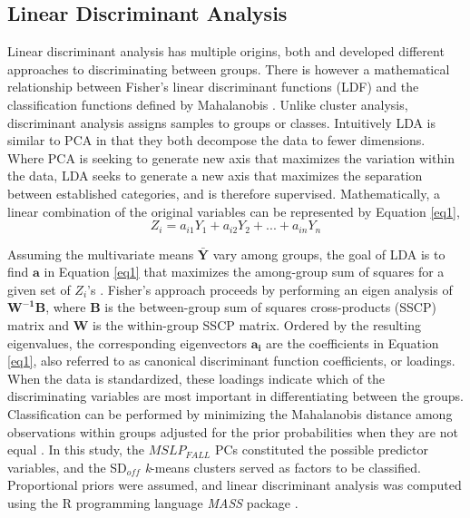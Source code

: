 \documentclass{tATO2e}
\newcommand{\sdoff}{SD$_{off}$}
\begin{document}
\subsection{Linear Discriminant Analysis}
Linear discriminant analysis has multiple origins, both \cite{Fisher1936} and \cite{Mahalanobis1936} developed different approaches to discriminating between groups. There is however a mathematical relationship between Fisher’s linear discriminant functions (LDF) and the classification functions defined by Mahalanobis \citep[e.g.,][]{Kshirsagar1975}. Unlike cluster analysis, discriminant analysis assigns samples to groups or classes. Intuitively LDA is similar to PCA in that they both decompose the data to fewer dimensions. Where PCA is seeking to generate new axis that maximizes the variation within the data, LDA seeks to generate a new axis that maximizes the separation between established categories, and is therefore supervised. Mathematically, a linear combination of the original variables can be represented by Equation \ref{eq1},
\begin{equation}
	Z_{i} = a_{i1}Y_{1} + a_{i2}Y_{2} + ... + a_{in}Y_{n}
	\label{eq1}
\end{equation}

Assuming the multivariate means $\mathbf{\bar{Y}}$ vary among groups, the goal of LDA is to find $\mathbf{a}$ in Equation \ref{eq1} that maximizes the among-group sum of squares for a given set of $Z_{i}$'s \citep{Gotelli2013}. Fisher’s approach proceeds by performing an eigen analysis of $\mathbf{W^{-1}B}$, where $\mathbf{B}$ is the between-group sum of squares cross-products (SSCP) matrix and $\mathbf{W}$ is the within-group SSCP matrix. Ordered by the resulting eigenvalues, the corresponding eigenvectors $\bm{a_{i}}$ are the coefficients in Equation \ref{eq1}, also referred to as canonical discriminant function coefficients, or loadings. When the data is standardized, these loadings indicate which of the discriminating variables are most important in differentiating between the groups. Classification can be performed by minimizing the Mahalanobis distance among observations within groups adjusted for the prior probabilities when they are not equal \citep{Venables2002}. In this study, the $MSLP_{FALL}$ PCs constituted the possible predictor variables, and the \sdoff{} \textit{k}-means clusters served as factors to be classified. Proportional priors were assumed, and linear discriminant analysis was computed using the R programming language \textit{MASS} package \citep{Venables2002}.
\end{document}
